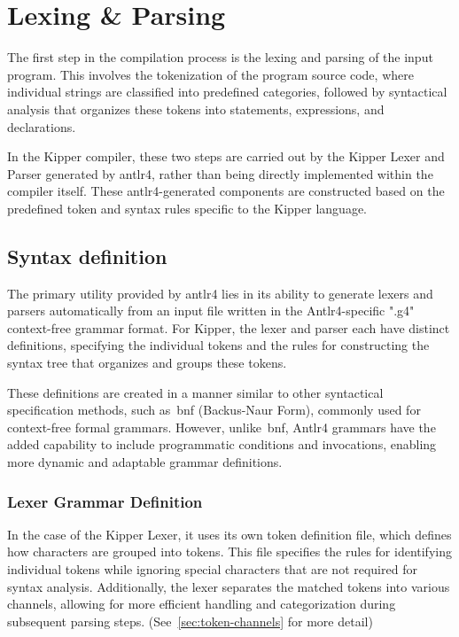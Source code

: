 \section{Lexing \& Parsing}
\label{sec:lexing-parsing}

The first step in the compilation process is the lexing and parsing of the input program. This involves the tokenization of the program source code, where individual strings are classified into predefined categories, followed by syntactical analysis that organizes these tokens into statements, expressions, and declarations.

In the Kipper compiler, these two steps are carried out by the Kipper Lexer and Parser generated by \Gls{antlr4}, rather than being directly implemented within the compiler itself. These \Gls{antlr4}-generated components are constructed based on the predefined token and syntax rules specific to the Kipper language.

\subsection{Syntax definition}

The primary utility provided by \Gls{antlr4} lies in its ability to generate lexers and parsers automatically from an input file written in the Antlr4-specific ".g4" context-free grammar format. For Kipper, the lexer and parser each have distinct definitions, specifying the individual tokens and the rules for constructing the syntax tree that organizes and groups these tokens.

These definitions are created in a manner similar to other syntactical specification methods, such as~\acrshort{bnf} (Backus-Naur Form), commonly used for context-free formal grammars. However, unlike~\acrshort{bnf}, Antlr4 grammars have the added capability to include programmatic conditions and invocations, enabling more dynamic and adaptable grammar definitions.

\subsubsection{Lexer Grammar Definition}
\label{sec:lexer-grammar-definition}

In the case of the Kipper Lexer, it uses its own token definition file, which defines how characters are grouped into tokens. This file specifies the rules for identifying individual tokens while ignoring special characters that are not required for syntax analysis. Additionally, the lexer separates the matched tokens into various channels, allowing for more efficient handling and categorization during subsequent parsing steps. (See~\ref{sec:token-channels} for more detail)

